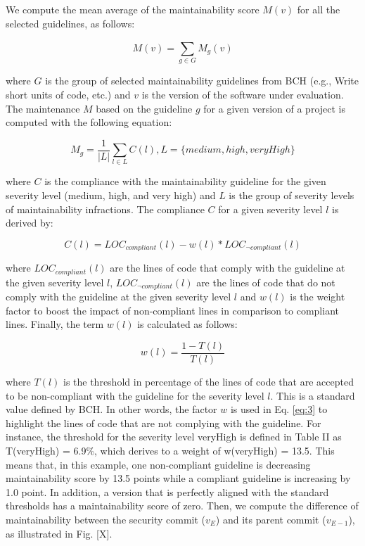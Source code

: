 \documentclass[10pt,conference]{IEEEtran}
\begin{document}
We compute the mean average of the maintainability score $M(v)$ for all the selected guidelines, as follows:

\begin{equation}
    M(v) = \sum_{g \in G}^{} M_{g}(v)
\end{equation}

where $G$ is the group of selected maintainability guidelines from BCH (e.g., Write short units of code, etc.) and $v$ is the
version of the software under evaluation. The maintenance $M$ based on the guideline $g$ for a given version of a project is computed with the following equation:

\begin{equation}
    M_{g} = \frac{1}{|L|} \sum_{l \in L}^{} C(l) , L = \{medium, high, veryHigh\}
\end{equation}

where $C$ is the compliance with the maintainability guideline for the given severity level (medium, high, and very high) and
$L$ is the group of severity levels of maintainability infractions. The compliance $C$ for a given severity level $l$ is derived by:

\begin{equation}\label{eq:3}
    C(l) = LOC_{compliant}(l) - w(l) * LOC_{\neg compliant}(l)
\end{equation}

where $LOC_{compliant}(l)$ are the lines of code that comply with the guideline at the given severity level $l$, $LOC_{\neg compliant}(l)$ are the lines of code that do not comply with the guideline at the given
severity level $l$ and $w(l)$ is the weight factor to boost the impact of
non-compliant lines in comparison to compliant lines. Finally, the term $w(l)$ is calculated as follows:

\begin{equation}
    w(l) = \frac{1 - T(l)}{T(l)}
\end{equation}

where $T(l)$ is the threshold in percentage of the lines of code that are accepted to be non-compliant with the guideline for the severity level $l$. This is a standard value defined by BCH. In other words, the factor $w$ is used in Eq. \ref{eq:3} to highlight the lines of code that are not complying with the guideline. For instance, the threshold for the severity level veryHigh is defined in Table II as T(veryHigh) = 6.9\%, which derives to a weight of w(veryHigh) = 13.5. This means that, in this example, one non-compliant guideline is decreasing maintainability score by 13.5 points while a compliant guideline is increasing by 1.0 point. In addition, a version that is perfectly aligned with the standard thresholds has a maintainability score of zero. Then, we compute the difference of maintainability between the security commit ($v_E$) and its parent commit ($v_{E-1}$), as illustrated in Fig. [X].
\end{document}
